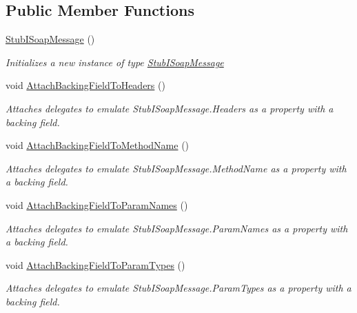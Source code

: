 \subsection*{Public Member Functions}
\begin{DoxyCompactItemize}
\item 
\hyperlink{class_system_1_1_runtime_1_1_serialization_1_1_formatters_1_1_fakes_1_1_stub_i_soap_message_ab2ae46774fa2a523f6165cb550e95108}{Stub\-I\-Soap\-Message} ()
\begin{DoxyCompactList}\small\item\em Initializes a new instance of type \hyperlink{class_system_1_1_runtime_1_1_serialization_1_1_formatters_1_1_fakes_1_1_stub_i_soap_message}{Stub\-I\-Soap\-Message}\end{DoxyCompactList}\item 
void \hyperlink{class_system_1_1_runtime_1_1_serialization_1_1_formatters_1_1_fakes_1_1_stub_i_soap_message_a2ea89a18ce0b2a955eff4edee42a6fb1}{Attach\-Backing\-Field\-To\-Headers} ()
\begin{DoxyCompactList}\small\item\em Attaches delegates to emulate Stub\-I\-Soap\-Message.\-Headers as a property with a backing field.\end{DoxyCompactList}\item 
void \hyperlink{class_system_1_1_runtime_1_1_serialization_1_1_formatters_1_1_fakes_1_1_stub_i_soap_message_a158b160367c8347bf6c6a62f430c9e2b}{Attach\-Backing\-Field\-To\-Method\-Name} ()
\begin{DoxyCompactList}\small\item\em Attaches delegates to emulate Stub\-I\-Soap\-Message.\-Method\-Name as a property with a backing field.\end{DoxyCompactList}\item 
void \hyperlink{class_system_1_1_runtime_1_1_serialization_1_1_formatters_1_1_fakes_1_1_stub_i_soap_message_abe1136090b22d1655e4cd8a394d653b9}{Attach\-Backing\-Field\-To\-Param\-Names} ()
\begin{DoxyCompactList}\small\item\em Attaches delegates to emulate Stub\-I\-Soap\-Message.\-Param\-Names as a property with a backing field.\end{DoxyCompactList}\item 
void \hyperlink{class_system_1_1_runtime_1_1_serialization_1_1_formatters_1_1_fakes_1_1_stub_i_soap_message_aeeb85cd646fe8670f5aeccaa6e475539}{Attach\-Backing\-Field\-To\-Param\-Types} ()
\begin{DoxyCompactList}\small\item\em Attaches delegates to emulate Stub\-I\-Soap\-Message.\-Param\-Types as a property with a backing field.\end{DoxyCompactList}\item 

\end{DoxyCompactItemize}
